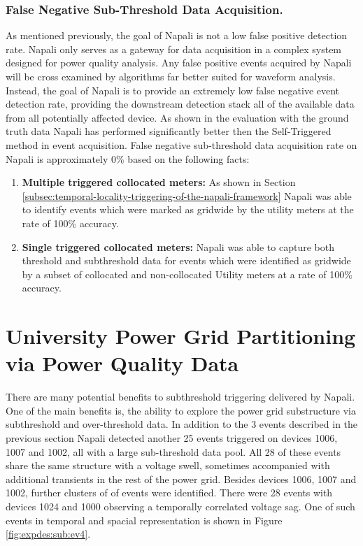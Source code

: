 \subsubsection{False Negative Sub-Threshold Data Acquisition.}

As mentioned previously, the goal of Napali is not a low false positive detection rate.
Napali only serves as a gateway for data acquisition in a complex system designed for power quality analysis.
Any false positive events acquired by Napali will be cross examined by algorithms far better suited for waveform analysis.
Instead, the goal of Napali is to provide an extremely low false negative event detection rate, providing the downstream detection stack all of the available data from all potentially affected device.
As shown in the evaluation with the ground truth data Napali has performed significantly better then the Self-Triggered method in event acquisition.
False negative sub-threshold data acquisition rate on Napali is approximately 0\% based on the following facts:
\begin{enumerate}
    \item \textbf{Multiple triggered collocated meters:} As shown in Section \ref{subsec:temporal-locality-triggering-of-the-napali-framework} Napali was able to identify events which were marked as gridwide by the utility meters at the rate of 100\% accuracy.
    \item \textbf{Single triggered collocated meters:} Napali was able to capture both threshold and subthreshold data for events which were identified as gridwide by a subset of collocated and non-collocated Utility meters at a rate of 100\% accuracy.
\end{enumerate}

\section{University Power Grid Partitioning via Power Quality Data}\label{sec:university-power-grid-partitioning-via-power-quality-data}
There are many potential benefits to subthreshold triggering delivered by Napali.
One of the main benefits is, the ability to explore the power grid substructure via subthreshold and over-threshold data.
In addition to the 3 events described in the previous section Napali detected another 25 events triggered on devices 1006, 1007 and 1002, all with a large sub-threshold data pool.
All 28 of these events share the same structure with a voltage swell, sometimes accompanied with additional transients in the rest of the power grid.
Besides devices 1006, 1007 and 1002, further clusters of of events were identified.
There were 28 events with devices 1024 and 1000 observing a temporally correlated voltage sag.
One of such events in temporal and spacial representation is shown in Figure \ref{fig:expdes:sub:ev4}.

